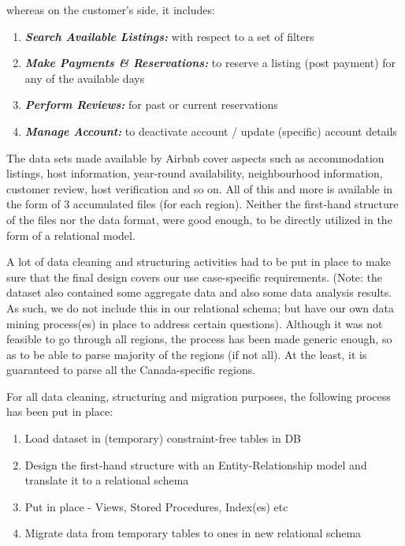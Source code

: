 \documentclass[conference]{IEEEtran}
\begin{document}
whereas on the customer’s side, it includes:
    \begin{enumerate}
         \item \textbf{\textit{Search Available Listings:}} with respect to a set of filters
	\item \textbf{\textit{Make Payments \& Reservations:}} to reserve a listing (post payment) for any of the available days
	\item \textbf{\textit{Perform Reviews:}}  for past or current reservations
	\item \textbf{\textit{Manage Account:}} to deactivate account / update (specific) account details
   \end{enumerate}

    \vspace{1mm}

The data sets made available by Airbnb\cite{1_Airbnb} cover aspects such as accommodation listings, host information, year-round availability, neighbourhood information, customer review, host verification and so on. All of this and more is available in the form of 3 accumulated files (for each region). Neither the first-hand structure of the files nor the data format, were good enough, to be directly utilized in the form of a relational model.

A lot of data cleaning and structuring activities had to be put in place to make sure that the final design covers our use case-specific requirements. (Note: the dataset also contained some aggregate data and also some data analysis results. As such, we do not include this in our relational schema; but have our own data mining process(es) in place to address certain questions). Although it was not feasible to go through all regions, the process has been made generic enough, so as to be able to parse majority of the regions (if not all). At the least, it is guaranteed to parse all the Canada-specific regions.

For all data cleaning, structuring and migration purposes, the following process has been put in place:
    \begin{enumerate}
        \item Load dataset in (temporary) constraint-free tables in DB
		\item Design the first-hand structure with an Entity-Relationship model and translate it to a relational schema
		\item Put in place - Views, Stored Procedures, Index(es)  etc
		\item Migrate data from temporary tables to ones in new relational schema
	\end{enumerate}
\end{document}
